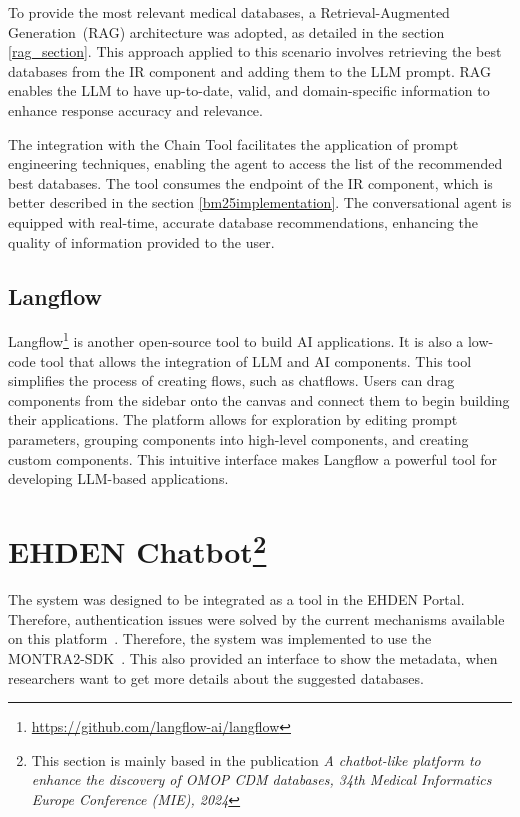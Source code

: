 To provide the most relevant medical databases, a Retrieval-Augmented Generation~(RAG) architecture was adopted, as detailed in the section \ref{rag_section}. This approach applied to this scenario involves retrieving the best databases from the IR component and adding them to the LLM prompt. RAG enables the LLM to have up-to-date, valid, and domain-specific information to enhance response accuracy and relevance. 

The integration with the Chain Tool facilitates the application of prompt engineering techniques, enabling the agent to access the list of the recommended best databases. The tool consumes the endpoint of the IR component, which is better described in the section \ref{bm25implementation}. The conversational agent is equipped with real-time, accurate database recommendations, enhancing the quality of information provided to the user. 


\subsection{Langflow}

Langflow\footnote{\url{https://github.com/langflow-ai/langflow}} is another open-source tool to build AI applications. It is also a low-code tool that allows the integration of LLM and AI components. This tool simplifies the process of creating flows, such as chatflows. Users can drag components from the sidebar onto the canvas and connect them to begin building their applications. The platform allows for exploration by editing prompt parameters, grouping components into high-level components, and creating custom components. This intuitive interface makes Langflow a powerful tool for developing LLM-based applications.





\section{EHDEN Chatbot\protect\footnote{This section is mainly based in the publication \textit{A chatbot-like platform to enhance the
discovery of OMOP CDM databases, 34th Medical Informatics Europe Conference (MIE), 2024}}}


The system was designed to be integrated as a tool in the EHDEN Portal. Therefore, authentication issues were solved by the current mechanisms available on this platform~\cite{almeida2024federated}. Therefore, the system was implemented to use the MONTRA2-SDK~\cite{almeida2024montra2}. This also provided an interface to show the metadata, when researchers want to get more details about the suggested databases. 

